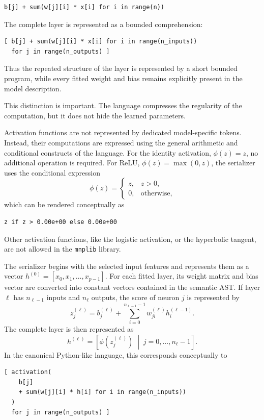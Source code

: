 \begin{verbatim}
b[j] + sum(w[j][i] * x[i] for i in range(n))
\end{verbatim}

The complete layer is represented as a bounded comprehension:

\begin{verbatim}
[ b[j] + sum(w[j][i] * x[i] for i in range(n_inputs))
  for j in range(n_outputs) ]
\end{verbatim}

Thus the repeated structure of the layer is represented by a short bounded program, while every fitted weight and bias remains explicitly present in the model description.

This distinction is important. The language compresses the regularity of the computation, but it does not hide the learned parameters.

Activation functions are not represented by dedicated model-specific tokens. Instead, their computations are expressed using the general arithmetic and conditional constructs of the language. For the identity activation, $\phi(z)=z$, no additional operation is required. For ReLU, $\phi(z)=\max(0,z)$, the serializer uses the conditional expression
\[
\phi(z) = 
\begin{cases}
z, & z>0,\\
0, & \text{otherwise},
\end{cases}
\]
which can be rendered conceptually as
\begin{verbatim}
z if z > 0.00e+00 else 0.00e+00
\end{verbatim}

Other activation functions, like the logistic activation, or the hyperbolic tangent, are not allowed in the \texttt{mnplib} library. 

The serializer begins with the selected input features and represents them as a vector $h^{(0)} = [x_0,x_1,\ldots,x_{p-1}]$. For each fitted layer, its weight matrix and bias vector are converted into constant vectors contained in the semantic AST. If layer $\ell$ has $n_{\ell-1}$ inputs and $n_\ell$ outputs, the score of
neuron $j$ is represented by
\[
z_j^{(\ell)} = b_j^{(\ell)} + \sum_{i=0}^{n_{\ell-1}-1} w_{ji}^{(\ell)} h_i^{(\ell-1)}.
\]
The complete layer is then represented as
\[
h^{(\ell)} = \left[ \phi\!\left(z_j^{(\ell)}\right) \;\middle|\; j=0,\ldots,n_\ell-1 \right].
\]
In the canonical Python-like language, this corresponds conceptually to

\begin{verbatim}
[ activation(
    b[j]
    + sum(w[j][i] * h[i] for i in range(n_inputs))
  )
  for j in range(n_outputs) ]
\end{verbatim}

